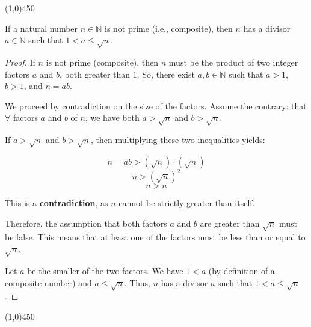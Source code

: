     \begin{center}
        \vspace{10pt}
        \line(1,0){450}
        \vspace{25pt}
    \end{center}

\begin{proposition}
    If a natural number $n \in \mathbb{N}$ is not prime (i.e., composite), then $n$ has a divisor $a \in \mathbb{N}$ such that $1 < a \le \sqrt{n}$.
\end{proposition}

\begin{proof}
    If $n$ is not prime (composite), then $n$ must be the product of two integer factors $a$ and $b$, both greater than $1$. So, there exist $a, b \in \mathbb{N}$ such that $a > 1$, $b > 1$, and $n = ab$.
    
    We proceed by contradiction on the size of the factors. Assume the contrary: that $\forall$ factors $a$ and $b$ of $n$, we have both $a > \sqrt{n}$ and $b > \sqrt{n}$.
    
    If $a > \sqrt{n}$ and $b > \sqrt{n}$, then multiplying these two inequalities yields:
    
    $$n = ab > (\sqrt{n}) \cdot (\sqrt{n})$$
    $$n > (\sqrt{n})^2$$
    $$n > n$$
    
    This is a \textbf{contradiction}, as $n$ cannot be strictly greater than itself.
    
    Therefore, the assumption that both factors $a$ and $b$ are greater than $\sqrt{n}$ must be false. This means that at least one of the factors must be less than or equal to $\sqrt{n}$.
    
    Let $a$ be the smaller of the two factors. We have $1 < a$ (by definition of a composite number) and $a \le \sqrt{n}$. Thus, $n$ has a divisor $a$ such that $1 < a \le \sqrt{n}$.
\end{proof}

    \begin{center}
        \vspace{10pt}
        \line(1,0){450}
        \vspace{25pt}
    \end{center}

